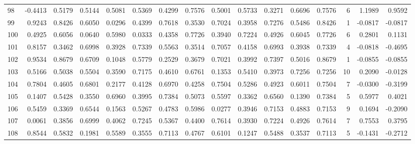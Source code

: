 \begin{tabular}{lrrrrrrrrrrrrrrr}
98  &     -0.4413 &  0.5179 &  0.5144 &  0.5081 &  0.5369 &  0.4299 &  0.7576 &  0.5001 &  0.5733 &  0.3271 &   0.6696 &     0.7576 &      6 &                    1.1989 &                     0.9592 \\
99  &      0.9243 &  0.8426 &  0.6050 &  0.0296 &  0.4399 &  0.7618 &  0.3530 &  0.7024 &  0.3958 &  0.7276 &   0.5486 &     0.8426 &      1 &                   -0.0817 &                    -0.0817 \\
100 &      0.4925 &  0.6056 &  0.0640 &  0.5980 &  0.0333 &  0.4358 &  0.7726 &  0.3940 &  0.7224 &  0.4926 &   0.6045 &     0.7726 &      6 &                    0.2801 &                     0.1131 \\
101 &      0.8157 &  0.3462 &  0.6998 &  0.3928 &  0.7339 &  0.5563 &  0.3514 &  0.7057 &  0.4158 &  0.6993 &   0.3938 &     0.7339 &      4 &                   -0.0818 &                    -0.4695 \\
102 &      0.9534 &  0.8679 &  0.6709 &  0.1048 &  0.5779 &  0.2529 &  0.3679 &  0.7021 &  0.3992 &  0.7397 &   0.5016 &     0.8679 &      1 &                   -0.0855 &                    -0.0855 \\
103 &      0.5166 &  0.5038 &  0.5504 &  0.3590 &  0.7175 &  0.4610 &  0.6761 &  0.1353 &  0.5410 &  0.3973 &   0.7256 &     0.7256 &     10 &                    0.2090 &                    -0.0128 \\
104 &      0.7804 &  0.4605 &  0.6801 &  0.2177 &  0.4128 &  0.6970 &  0.4258 &  0.7504 &  0.5286 &  0.4923 &   0.6011 &     0.7504 &      7 &                   -0.0300 &                    -0.3199 \\
105 &      0.1407 &  0.5428 &  0.3550 &  0.6960 &  0.3995 &  0.7384 &  0.5073 &  0.5597 &  0.3362 &  0.6560 &   0.1390 &     0.7384 &      5 &                    0.5977 &                     0.4021 \\
106 &      0.5459 &  0.3369 &  0.6544 &  0.1563 &  0.5267 &  0.4783 &  0.5986 &  0.0277 &  0.3946 &  0.7153 &   0.4883 &     0.7153 &      9 &                    0.1694 &                    -0.2090 \\
107 &      0.0061 &  0.3856 &  0.6999 &  0.4062 &  0.7245 &  0.5367 &  0.4400 &  0.7614 &  0.3930 &  0.7224 &   0.4926 &     0.7614 &      7 &                    0.7553 &                     0.3795 \\
108 &      0.8544 &  0.5832 &  0.1981 &  0.5589 &  0.3555 &  0.7113 &  0.4767 &  0.6101 &  0.1247 &  0.5488 &   0.3537 &     0.7113 &      5 &                   -0.1431 &                    -0.2712 \\

\end{tabular}
